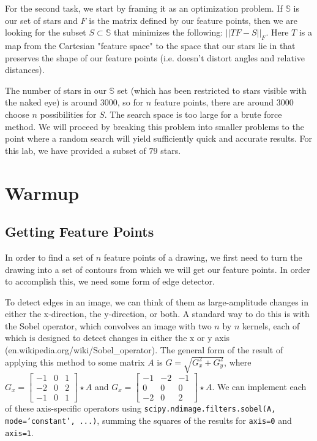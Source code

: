 \documentclass[paper=a4, fontsize=11pt]{scrartcl} %
\begin{document}
For the second task, we start by framing it as an optimization problem. If $\mathbb{S}$ is our set of stars and $F$ is the matrix defined by our feature points, then we are looking for the subset $S\subset\mathbb{S}$ that minimizes the following: $||TF - S||_F$.  Here $T$ is a map from the Cartesian "feature space" to the space that our stars lie in that preserves the shape of our feature points (i.e. doesn't distort angles and relative distances).

The number of stars in our $\mathbb{S}$ set (which has been restricted to stars visible with the naked eye) is around 3000, so for $n$ feature points, there are around 3000 choose $n$ possibilities for $S$. The search space is too large for a brute force method.  We will proceed by breaking this problem into smaller problems to the point where a random search will yield sufficiently quick and accurate results. For this lab, we have provided a subset of $79$ stars.
\section{Warmup}

\subsection{Getting Feature Points}

In order to find a set of $n$ feature points of a drawing, we first need to turn the drawing into a set of contours from which we will get our feature points. In order to accomplish this, we need some form of edge detector. 

To detect edges in an image, we can think of them as large-amplitude changes in either the x-direction, the y-direction, or both. A standard way to do this is with the Sobel operator, which convolves an image with two $n$ by $n$ kernels, each of which is designed to detect changes in either the x or y axis (en.wikipedia.org/wiki/Sobel\_operator). The general form of the result of applying this method to some matrix $A$ is $G = \sqrt{G_x^2 + G_y^2}$, where $G_x = \begin{bmatrix}
-1& 0 & 1\\
-2 & 0& 2\\
-1 & 0& 1
\end{bmatrix}\star A$ and $G_x =\begin{bmatrix}
-1 & -2 & -1\\
0 & 0 & 0\\
-2 & 0 & 2
\end{bmatrix} \star A$. We can implement each of these axis-specific operators using \texttt{scipy.ndimage.filters.sobel(A, mode='constant', ...)}, summing the squares of the results for \texttt{axis=0} and \texttt{axis=1}.
\end{document}
